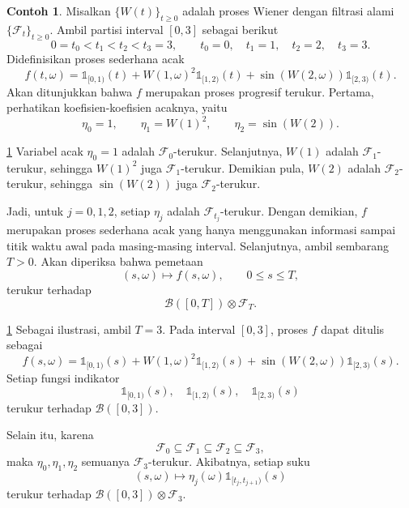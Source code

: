 \documentclass[aspectratio=169,11pt]{beamer}
\theoremstyle{definition}
\newtheorem{contoh}{Contoh}
\newcommand{\myref}[1]{\hyperref[#1]{\nameCref{#1} \ref*{#1}}}
\begin{document}
\begin{frame}{\insertsection}{\insertsubsection}
  \begin{contoh}\label{cth:5.9}
    Misalkan $\{W(t)\}_{t\geq 0}$ adalah proses Wiener dengan filtrasi alami
    $\{\mathcal{F}_t\}_{t\geq 0}$. Ambil partisi interval $[0,3]$ sebagai berikut
    \[
      0=t_0<t_1<t_2<t_3=3,
      \qquad
      t_0=0,\quad t_1=1,\quad t_2=2,\quad t_3=3.
    \]
    Didefinisikan proses sederhana acak
    \[
      f(t,\omega)
      =
      \mathds{1}_{[0,1)}(t)
      +W(1,\omega)^2\mathds{1}_{[1,2)}(t)
      +\sin(W(2,\omega))\mathds{1}_{[2,3)}(t).
    \]
    Akan ditunjukkan bahwa $f$ merupakan proses progresif terukur. Pertama,
    perhatikan koefisien-koefisien acaknya, yaitu
    \[
      \eta_0=1,\qquad
      \eta_1=W(1)^2,\qquad
      \eta_2=\sin(W(2)).
    \]
  \end{contoh}
\end{frame}
\begin{frame}{\insertsection}{\insertsubsection}
  \begin{exampleblock}{\myref{cth:5.9}}
    Variabel acak $\eta_0=1$ adalah $\mathcal{F}_0$-terukur. Selanjutnya,
    $W(1)$ adalah $\mathcal{F}_1$-terukur, sehingga $W(1)^2$ juga
    $\mathcal{F}_1$-terukur. Demikian pula, $W(2)$ adalah
    $\mathcal{F}_2$-terukur, sehingga $\sin(W(2))$ juga
    $\mathcal{F}_2$-terukur.

    Jadi, untuk $j=0,1,2$, setiap $\eta_j$ adalah $\mathcal{F}_{t_j}$-terukur.
    Dengan demikian, $f$ merupakan proses sederhana acak yang hanya menggunakan
    informasi sampai titik waktu awal pada masing-masing interval.
    Selanjutnya, ambil sembarang $T>0$. Akan diperiksa bahwa pemetaan
    \[
      (s,\omega)\mapsto f(s,\omega),
      \qquad 0\leq s\leq T,
    \]
    terukur terhadap
    \[
      \mathcal{B}([0,T])\otimes\mathcal{F}_T.
    \]
  \end{exampleblock}
\end{frame}
\begin{frame}{\insertsection}{\insertsubsection}
  \begin{exampleblock}{\myref{cth:5.9}}
    Sebagai ilustrasi, ambil $T=3$. Pada interval $[0,3]$, proses $f$ dapat ditulis
    sebagai
    \[
      f(s,\omega)
      =
      \mathds{1}_{[0,1)}(s)
      +W(1,\omega)^2\mathds{1}_{[1,2)}(s)
      +\sin(W(2,\omega))\mathds{1}_{[2,3)}(s).
    \]
    Setiap fungsi indikator
    \[
      \mathds{1}_{[0,1)}(s),\quad
      \mathds{1}_{[1,2)}(s),\quad
      \mathds{1}_{[2,3)}(s)
    \]
    terukur terhadap $\mathcal{B}([0,3])$.

    Selain itu, karena
    \[
      \mathcal{F}_0\subseteq\mathcal{F}_1\subseteq\mathcal{F}_2
      \subseteq\mathcal{F}_3,
    \]
    maka $\eta_0,\eta_1,\eta_2$ semuanya $\mathcal{F}_3$-terukur. Akibatnya,
    setiap suku
    \[
      (s,\omega)\mapsto
      \eta_j(\omega)\mathds{1}_{[t_j,t_{j+1})}(s)
    \]
    terukur terhadap $\mathcal{B}([0,3])\otimes\mathcal{F}_3$.
  \end{exampleblock}
\end{frame}
\end{document}
